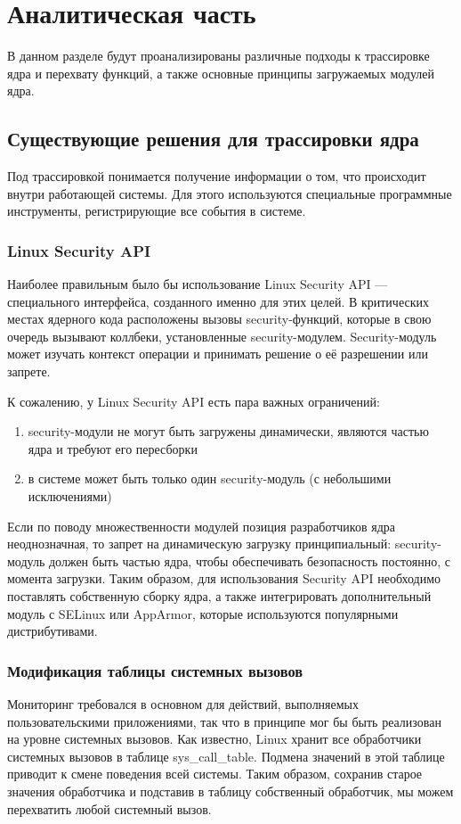\chapter{Аналитическая часть}
	В данном разделе будут проанализированы различные подходы к трассировке ядра 
	и перехвату функций, а также основные принципы загружаемых модулей ядра.

\section{Существующие решения для трассировки ядра}
	Под трассировкой понимается получение информации о том, 
	что происходит внутри работающей системы. 
	Для этого используются специальные программные инструменты,
	регистрирующие все события в системе. 

	\subsection{Linux Security API}
	Наиболее правильным было бы использование Linux Security API — специального интерфейса, созданного именно для этих целей. В критических местах ядерного кода расположены вызовы security-функций, которые в свою очередь вызывают коллбеки, установленные security-модулем. Security-модуль может изучать контекст операции и принимать решение о её разрешении или запрете.

	К сожалению, у Linux Security API есть пара важных ограничений:
	\begin{enumerate}
		\item security-модули не могут быть загружены динамически, являются частью ядра и требуют его пересборки
		\item в системе может быть только один security-модуль (с небольшими исключениями)
	\end{enumerate}

	Если по поводу множественности модулей позиция разработчиков ядра неоднозначная, то запрет на динамическую загрузку принципиальный: security-модуль должен быть частью ядра, чтобы обеспечивать безопасность постоянно, с момента загрузки. Таким образом, для использования Security API необходимо поставлять собственную сборку ядра, а также интегрировать дополнительный модуль с SELinux или AppArmor, которые используются популярными дистрибутивами.

	\subsection{Модификация таблицы системных вызовов}
	Мониторинг требовался в основном для действий, выполняемых пользовательскими приложениями, так что в принципе мог бы быть реализован на уровне системных вызовов. Как известно, Linux хранит все обработчики системных вызовов в таблице sys\_call\_table. Подмена значений в этой таблице приводит к смене поведения всей системы. Таким образом, сохранив старое значения обработчика и подставив в таблицу собственный обработчик, мы можем перехватить любой системный вызов.

